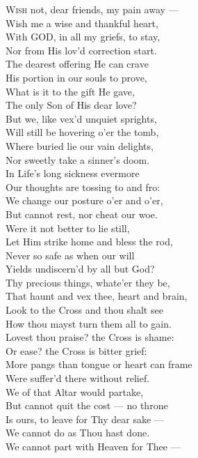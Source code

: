 \textsc{Wish} not, dear friends, my pain away — \\
 Wish me a wise and thankful heart, \\
 With GOD, in all my griefs, to stay, \\
 Nor from His lov’d correction start. \\
  The dearest offering He can crave \\
 His portion in our souls to prove, \\
 What is it to the gift He gave, \\
 The only Son of His dear love? \\
  But we, like vex’d unquiet sprights, \\
 Will still be hovering o’er the tomb, \\
 Where buried lie our vain delights, \\
 Nor sweetly take a sinner’s doom. \\
  In Life’s long sickness evermore \\
 Our thoughts are tossing to and fro: \\
 We change our posture o’er and o’er, \\
 But cannot rest, nor cheat our woe. \\
  Were it not better to lie still, \\
 Let Him strike home and bless the rod, \\
 Never so safe as when our will \\
 Yields undiscern’d by all but God? \\
  Thy precious things, whate’er they be, \\
 That haunt and vex thee, heart and brain, \\
 Look to the Cross and thou shalt see \\
 How thou mayst turn them all to gain. \\
  Lovest thou praise? the Cross is shame: \\
 Or ease? the Cross is bitter grief: \\
 More pangs than tongue or heart can frame \\
 Were suffer’d there without relief. \\
  We of that Altar would partake, \\
 But cannot quit the cost — no throne \\
 Is ours, to leave for Thy dear sake — \\
 We cannot do as Thou hast done. \\
  We cannot part with Heaven for Thee — \\
